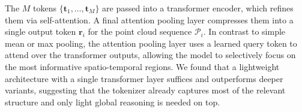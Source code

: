 

The $M$ tokens $\{\mathbf{t}_1, \dots, \mathbf{t}_M\}$ are passed into a transformer encoder, which refines them via self-attention.
A final attention pooling layer compresses them into a single output token $\mathbf{r}_i$ for the point cloud sequence $\mathcal {P}_i$.
In contrast to simple mean or max pooling, the attention pooling layer uses a learned query token to attend over the transformer outputs, allowing the model to selectively focus on the most informative spatio-temporal regions.
We found that a lightweight architecture with a single transformer layer suffices and outperforms deeper variants, suggesting that the tokenizer already captures most of the relevant structure and only light global reasoning is needed on top.


